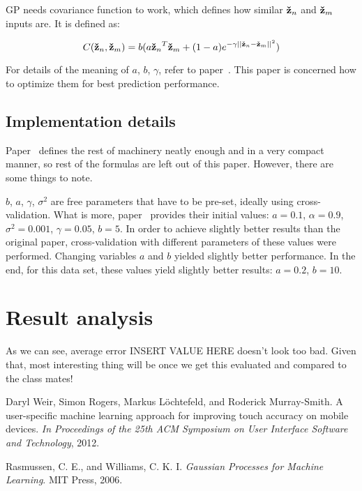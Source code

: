 \documentclass[english,11pt]{article}
\numberwithin{equation}{section}
\begin{document}
GP needs covariance function to work, which defines how similar $\zn$ and $\zm$
inputs are. It is defined as:

$$ C(\zn, \zm) = b(a \zn^T\zm +
(1 - a)e^{-\gamma || \zn - \zm ||^2 } )
$$

For details of the meaning of $a$, $b$, $\gamma$, refer to
paper~\cite{WeiRogMur}. This paper is concerned how to optimize them for best
prediction performance.

\subsection{Implementation details}

Paper~\cite{WeiRogMur} defines the rest of machinery neatly enough and in a very
compact manner, so rest of the formulas are left out of this paper. However,
there are some things to note.

$b$, $a$, $\gamma$, $\sigma^2$ are free parameters that have to be pre-set,
ideally using cross-validation. What is more, paper~\cite{WeiRogMur} provides
their initial values: $a = 0.1$, $\alpha = 0.9$, $\sigma^2 = 0.001$, $\gamma =
0.05$, $b = 5$. In order to achieve slightly better results than the original
paper, cross-validation with different parameters of these values were
performed. Changing variables $a$ and $b$ yielded slightly better performance.
In the end, for this data set, these values yield slightly better results: $a =
0.2$, $b = 10$.

\section{Result analysis}

As we can see, average error INSERT VALUE HERE doesn't look too bad. Given that,
most interesting thing will be once we get this evaluated and compared to the
class mates!

\clearpage

\begin{thebibliography}{9}

        Daryl Weir, Simon Rogers, Markus L\"ochtefeld, and Roderick
        Murray-Smith. A user-specific machine learning approach for improving
        touch accuracy on mobile devices. \emph{In Proceedings of the 25th ACM
        Symposium on User Interface Software and Technology}, 2012.

        Rasmussen, C. E., and Williams, C. K. I. \emph{Gaussian Processes for
        Machine Learning}. MIT Press, 2006.

\end{thebibliography}
\end{document}

